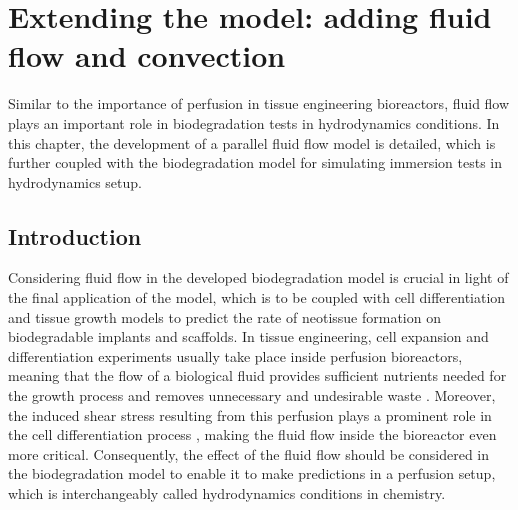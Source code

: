 \chapter{Extending the model: adding fluid flow and convection}\label{ch:fluid}

\noindent{}
\bigskip

Similar to the importance of perfusion in tissue engineering bioreactors, fluid flow plays an important role in biodegradation tests in hydrodynamics conditions. In this chapter, the development of a parallel fluid flow model is detailed, which is further coupled with the biodegradation model for simulating immersion tests in hydrodynamics setup.

\section{Introduction}

Considering fluid flow in the developed biodegradation model is crucial in light of the final application of the model, which is to be coupled with cell differentiation and tissue growth models to predict the rate of neotissue formation on biodegradable implants and scaffolds. In tissue engineering, cell expansion and differentiation experiments usually take place inside perfusion bioreactors, meaning that the flow of a biological fluid provides sufficient nutrients needed for the growth process and removes unnecessary and undesirable waste \cite{Sikavitsas2005,Grayson2010,Sonnaert2014}. Moreover, the induced shear stress resulting from this perfusion plays a prominent role in the cell differentiation process \cite{Song2013,McCoy2012,Rauh2011,Papantoniou2013}, making the fluid flow inside the bioreactor even more critical. Consequently, the effect of the fluid flow should be considered in the biodegradation model to enable it to make predictions in a perfusion setup, which is interchangeably called hydrodynamics conditions in chemistry.

